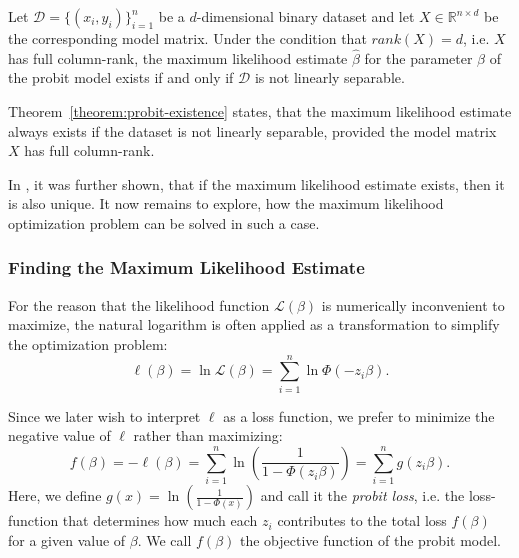 \begin{theorem}
    \label{theorem:probit-existence}
    Let $\mathcal{D}=\{(x_i, y_i)\}_{i=1}^n$ be a $d$-dimensional
    binary dataset and let
    $X \in \mathbb{R}^{n \times d}$ be the corresponding model matrix.
    Under the condition that $rank(X)=d$, i.e. $X$ has full column-rank,
    the maximum likelihood estimate $\hat{\beta}$ for the
    parameter $\beta$ of the probit model
    exists if and only if $\mathcal{D}$ is not linearly separable.
\end{theorem}

\noindent Theorem~\ref{theorem:probit-existence} states,
that the maximum likelihood estimate always exists if the dataset
is not linearly separable, provided the model matrix $X$ has
full column-rank.

\noindent In \cite{wedderburn}, it was further shown, that if the maximum likelihood
estimate exists, then it is also unique.
It now remains to explore, how the maximum likelihood optimization
problem can be solved in such a case.

\subsubsection{Finding the Maximum Likelihood Estimate}

For the reason that the likelihood function $\mathcal{L}(\beta)$ is
numerically inconvenient to maximize, the natural logarithm is often
applied as a transformation to simplify the optimization problem:
\begin{equation}
    \ell(\beta) = \ln \mathcal{L}(\beta) = \sum_{i=1}^n \ln \Phi(- z_i \beta).
\end{equation}

\noindent Since we later wish to interpret $\ell$ as a loss function, we prefer
to minimize the negative value of $\ell$ rather than maximizing:
\begin{equation}
    f(\beta) = -\ell(\beta)
    = \sum_{i=1}^n \ln \left( \frac{1}{1 - \Phi(z_i \beta)} \right)
    = \sum_{i=1}^n g(z_i \beta).
\end{equation}
Here, we define $g(x) = \ln \left(\frac{1}{1 - \Phi(x)}\right)$
and call it the \textit{probit loss}, i.e. the loss-function that
determines how much each $z_i$ contributes to the total loss $f(\beta)$
for a given value of $\beta$.
We call $f(\beta)$ the objective function of the probit model.

